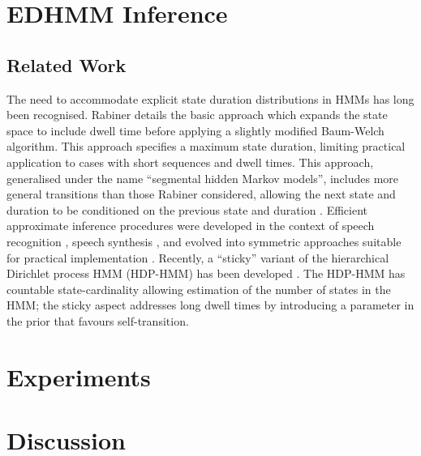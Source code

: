 \documentclass[journal]{../inc/oldtran/IEEEtran}
\begin{document}




\section{EDHMM Inference}

\label{sec:inference}




\subsection{Related Work}

The need to accommodate explicit state duration distributions in HMMs has long been recognised. Rabiner \cite{Rabiner89} details the basic approach which expands the state space to include dwell time before applying a slightly modified Baum-Welch algorithm. This approach specifies a maximum state duration, limiting practical application 
to cases with short sequences and dwell times.
This approach, generalised under the name ``segmental hidden Markov models'', includes more general transitions than those Rabiner considered, allowing the next state and duration to be conditioned on the previous state and duration \cite{Gales93}. Efficient approximate inference procedures were developed in the context of speech recognition \cite{Ostendorf96}, speech synthesis \cite{Zen07}, and evolved into symmetric approaches suitable for practical implementation \cite{Yu2006}. Recently, a ``sticky'' variant of the hierarchical Dirichlet process HMM (HDP-HMM) has been developed \cite{Fox2008}.  The HDP-HMM has countable state-cardinality \cite{Teh06} allowing estimation of the number of states in the HMM; the sticky aspect addresses long dwell times by introducing a parameter in the prior that favours self-transition. 


\section{Experiments}

\label{sec:experiments}




\section{Discussion}

\label{sec:dicussion}






\end{document}

